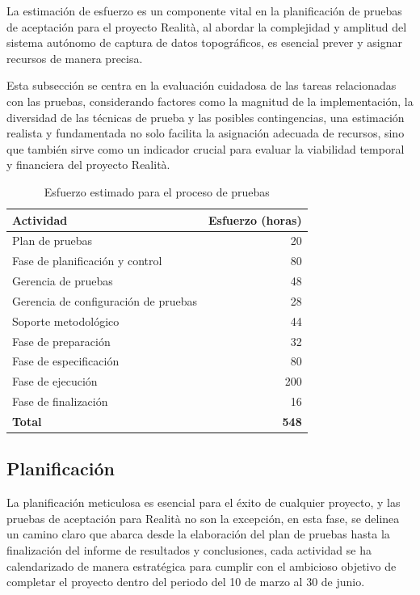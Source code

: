 \documentclass[12pt,a4paper, twoside]{article} %
\begin{document}
La estimación de esfuerzo es un componente vital en la planificación de pruebas de aceptación para el proyecto Realità, al abordar la complejidad y amplitud del sistema autónomo de captura de datos topográficos, es esencial prever y asignar recursos de manera precisa. 

Esta subsección se centra en la evaluación cuidadosa de las tareas relacionadas con las pruebas, considerando factores como la magnitud de la implementación, la diversidad de las técnicas de prueba y las posibles contingencias, una estimación realista y fundamentada no solo facilita la asignación adecuada de recursos, sino que también sirve como un indicador crucial para evaluar la viabilidad temporal y financiera del proyecto Realità.

\begin{table}[h]
\centering
\begin{tabular}{|l |r|}
\hline
\textbf{Actividad} & \textbf{Esfuerzo (horas)} \\
\hline
Plan de pruebas & 20 \\
Fase de planificación y control & 80 \\
Gerencia de pruebas & 48 \\
Gerencia de configuración de pruebas & 28 \\
Soporte metodológico & 44 \\
Fase de preparación & 32 \\
Fase de especificación & 80 \\
Fase de ejecución & 200 \\
Fase de finalización & 16 \\
\hline
\textbf{Total} & \textbf{548} \\
\hline
\end{tabular}
\caption{Esfuerzo estimado para el proceso de pruebas}
\label{tab:estimated_effort}
\end{table}


\subsection{Planificación}

La planificación meticulosa es esencial para el éxito de cualquier proyecto, y las pruebas de aceptación para Realità no son la excepción, en esta fase, se delinea un camino claro que abarca desde la elaboración del plan de pruebas hasta la finalización del informe de resultados y conclusiones, cada actividad se ha calendarizado de manera estratégica para cumplir con el ambicioso objetivo de completar el proyecto dentro del periodo del 10 de marzo al 30 de junio. 
\end{document}
